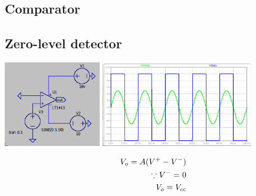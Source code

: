\documentclass[a4paper, 12pt]{report}
\begin{document}
\begin{center}
\begin{center}
\begin{center}
\begin{center}
\begin{center}
\begin{center}
\begin{center}
\begin{center}
\begin{center}
\begin{center}
\begin{center}
\begin{center}
\section{Comparator}
\subsection{Zero-level detector}
\begin{center}
\includegraphics[width=0.32\textwidth]{figures/21c.png} \quad\quad
\includegraphics[width=0.5\textwidth]{figures/21w.png} \\
\end{center}
\begin{equation}
    \notag
    \begin{align}
    V_o = A(V^{+} - V^{-}) \\
    \because V^{-} = 0 \\
    V_o = V_\text{cc}
    \end{align}
\end{equation}

\end{center}
\end{center}
\end{center}
\end{center}
\end{center}
\end{center}
\end{center}
\end{center}
\end{center}
\end{center}
\end{center}
\end{center}
\end{document}
